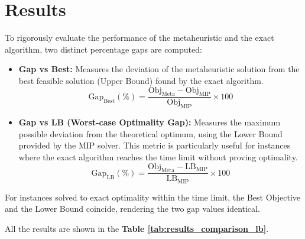 \chapter{Results}
\label{sec:intro_res}

To rigorously evaluate the performance of the metaheuristic and the exact algorithm, two distinct percentage gaps are computed:

\begin{itemize}
    \item \textbf{Gap vs Best:} Measures the deviation of the metaheuristic solution from the best feasible solution (Upper Bound) found by the exact algorithm.
    \begin{equation}
        \text{Gap}_{\text{Best}} (\%) = \frac{\text{Obj}_{\text{Meta}} - \text{Obj}_{\text{MIP}}}{\text{Obj}_{\text{MIP}}} \times 100
    \end{equation}
    
    \item \textbf{Gap vs LB (Worst-case Optimality Gap):} Measures the maximum possible deviation from the theoretical optimum, using the Lower Bound provided by the MIP solver. This metric is particularly useful for instances where the exact algorithm reaches the time limit without proving optimality.
    \begin{equation}
        \text{Gap}_{\text{LB}} (\%) = \frac{\text{Obj}_{\text{Meta}} - \text{LB}_{\text{MIP}}}{\text{LB}_{\text{MIP}}} \times 100
    \end{equation}
\end{itemize}

For instances solved to exact optimality within the time limit, the Best Objective and the Lower Bound coincide, rendering the two gap values identical.

All the results are shown in the \textbf{Table \ref{tab:results_comparison_lb}}.

\DTLsetseparator{;}


